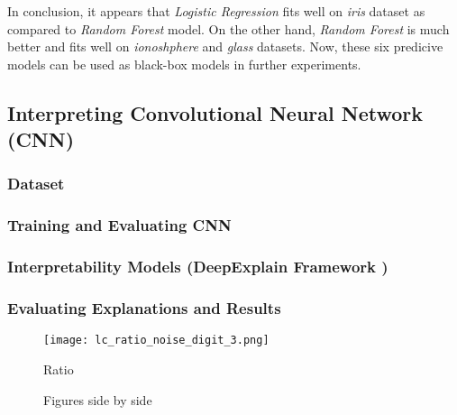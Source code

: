 \documentclass[english]{tktltiki2}
\theoremstyle{definition}
\theoremstyle{remark}
\begin{document}
In conclusion, it appears that \textit{Logistic Regression} fits well on \textit{iris} dataset as compared to \textit{Random Forest} model. On the other hand, \textit{Random Forest} is much better and fits well on \textit{ionoshphere} and \textit{glass} datasets. Now, these six predicive models can be used as black-box models in further experiments.

\subsection{Interpreting Convolutional Neural Network (CNN)}\label{sec:interpret_CNN}
\subsubsection{Dataset}
\subsubsection{Training and Evaluating CNN}
\subsubsection{Interpretability Models (DeepExplain Framework )}
\subsubsection{Evaluating Explanations and Results}

\begin{figure}[H]
	\vspace*{0mm}
	\centering
	\texttt{[image: lc\_ratio\_noise\_digit\_3.png]}
	\caption{Ratio}%
	\label{fig:digit3_noise_ratio}%
\end{figure}

\begin{figure}[H]
	\vspace*{-5mm}
	\centering
	\qquad
	\qquad
	\qquad
	\qquad
	\caption{Figures side by side}%
	\label{fig:digit3_noise_deviations}%
\end{figure}
\end{document}
